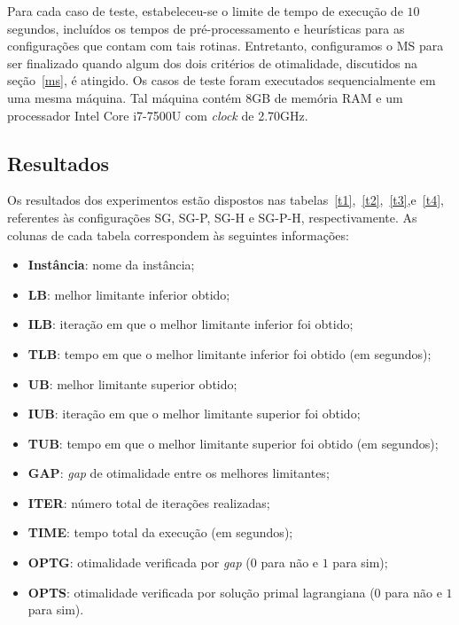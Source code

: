 \documentclass[12pt, a4paper]{article}
\theoremstyle{plain}
\theoremstyle{definition}
\theoremstyle{remark}
\begin{document}
Para cada caso de teste, estabeleceu-se o limite de tempo de execução de $10$ segundos, incluídos os tempos de pré-processamento e heurísticas para as configurações que contam com tais rotinas. Entretanto, configuramos o MS para ser finalizado quando algum dos dois critérios de otimalidade, discutidos na seção~\ref{ms}, é atingido. Os casos de teste foram executados sequencialmente em uma mesma máquina. Tal máquina contém 8GB de memória RAM e um processador Intel Core i7-7500U com \textit{clock} de 2.70GHz.

\subsection{Resultados}

Os resultados dos experimentos estão dispostos nas tabelas~\ref{t1},~\ref{t2},~\ref{t3},e~\ref{t4}, referentes às configurações SG, SG-P, SG-H e SG-P-H, respectivamente. As colunas de cada tabela correspondem às seguintes informações:

\begin{itemize}[before=\vspace{\baselineskip},after=\vspace{\baselineskip}]
\item \textbf{Instância}: nome da instância;
\item \textbf{LB}: melhor limitante inferior obtido;
\item \textbf{ILB}: iteração em que o melhor limitante inferior foi obtido;
\item \textbf{TLB}: tempo em que o melhor limitante inferior foi obtido (em segundos);
\item \textbf{UB}: melhor limitante superior obtido;
\item \textbf{IUB}: iteração em que o melhor limitante superior foi obtido;
\item \textbf{TUB}: tempo em que o melhor limitante superior foi obtido (em segundos);
\item \textbf{GAP}: \textit{gap} de otimalidade entre os melhores limitantes;
\item \textbf{ITER}: número total de iterações realizadas;
\item \textbf{TIME}: tempo total da execução (em segundos);
\item \textbf{OPTG}: otimalidade verificada por \textit{gap} ($0$ para não e $1$ para sim);
\item \textbf{OPTS}: otimalidade verificada por solução primal lagrangiana ($0$ para não e $1$ para sim).
\end{itemize}
\end{document}
